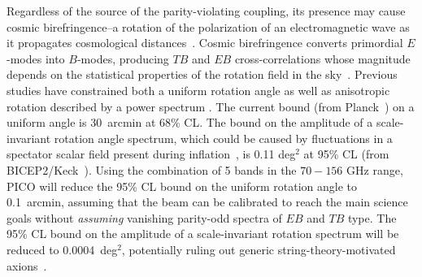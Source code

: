 \documentclass[PICOReport.tex]{subfiles}
\begin{document}
Regardless of the source of the parity-violating coupling, its presence may cause cosmic birefringence--a rotation of the polarization of an electromagnetic wave as it propagates cosmological distances~\cite{Harari:1992ea,Carroll:1989vb,Carroll:1998zi}. Cosmic birefringence converts primordial $E$-modes into $B$-modes, producing $TB$ and $EB$ cross-correlations whose magnitude depends on the statistical properties of the rotation field in the sky~\cite{Kamionkowski:2008fp,Gluscevic:2009mm,Gluscevic:2012me}. Previous studies have constrained both a uniform rotation angle as well as anisotropic rotation described by a power spectrum \cite{Gluscevic:2012me}. The current bound (from Planck~\cite{Aghanim:2016fhp}) on a uniform angle is 30~arcmin at 68\% CL. The bound on the amplitude of a scale-invariant rotation angle spectrum, which could be caused by fluctuations in a spectator scalar field present during inflation~\cite{Pospelov:2008gg}, is 0.11 deg$^2$ at 95\% CL (from BICEP2/Keck~\cite{Array:2017rlf}). Using the combination of 5 bands in the $70-156$ GHz range, PICO will reduce the 95\% CL bound on the uniform rotation angle to 0.1~arcmin, assuming that the beam can be calibrated to reach the main science goals without \emph{assuming} vanishing parity-odd spectra of $EB$ and $TB$ type. The 95\% CL bound on the amplitude of a scale-invariant rotation spectrum will be reduced to 0.0004~deg$^2$, potentially ruling out generic string-theory-motivated axions~\cite{Svrcek:2006yi,Pospelov:2008gg}.


\end{document}
